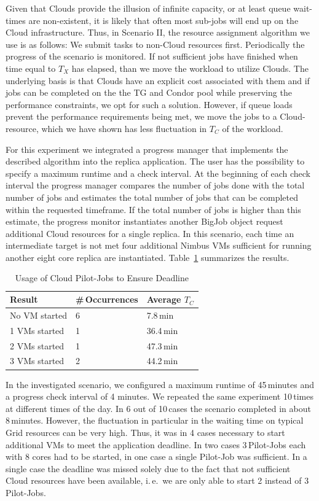 \documentclass[conference,final]{IEEEtran}
\newcommand{\tmax}{$T_{max}$ }
\newcommand{\tc}{$T_{C}$ }
\begin{document}
Given that Clouds provide the illusion of infinite capacity, or at
least queue wait-times are non-existent, it is likely that often most
sub-jobs will end up on the Cloud infrastructure.  Thus, in Scenario
II, the resource assignment algorithm we use is as follows: We submit
tasks to non-Cloud resources first. Periodically the progress of the
scenario is monitored. If not sufficient jobs have finished
when time equal to $T_{X}$ has elapsed,
than we move the workload to utilize Clouds.  The
underlying basis is that Clouds have an explicit cost associated with
them and if jobs can be completed on the the TG and Condor pool while
preserving the performance constraints, we opt for such a
solution. However, if queue loads prevent the performance requirements
being met, we move the jobs to a Cloud-resource, which we have shown
has less fluctuation in \tc of the workload.

For this experiment we integrated a progress manager that implements
the described algorithm into the replica application.  The user has
the possibility to specify a maximum runtime and a check interval.  At
the beginning of each check interval the progress manager compares the
number of jobs done with the total number of jobs and estimates the
total number of jobs that can be completed within the requested
timeframe. If the total number of jobs is higher than this estimate,
the progress monitor instantiates another BigJob object request
additional Cloud resources for a single replica.  In this scenario,
each time an intermediate target is not met four additional Nimbus VMs
sufficient for running another eight core replica are instantiated.
Table~\ref{tab:app_deadline} summarizes the results.

\begin{table}[ht]
    \centering
	\begin{tabular}{|l|l|l|}
	\hline
    Result & \#\,Occurrences &Average \tc \\ \hline
	No VM started &6 &7.8\,min\\ \hline
	1 VMs started &1 &36.4\,min\\ \hline
	2 VMs started &1 &47.3\,min\\ \hline
	3 VMs started &2 &44.2\,min\\ \hline
	\end{tabular}
	\caption{Usage of Cloud Pilot-Jobs to Ensure Deadline \label{tab:app_deadline}}
\end{table}

In the investigated scenario, we configured a maximum runtime of
45\,minutes and a progress check interval of 4 minutes. We repeated
the same experiment 10\,times at different times of the day. In 6 out
of 10\,cases the scenario completed in about 8\,minutes. However, the
fluctuation in particular in the waiting time on typical Grid
resources can be very high. Thus, it was in 4 cases necessary to
start additional VMs to meet the application deadline. 
In two cases 3\,Pilot-Jobs each with 8 cores had to be
started, in one case a single Pilot-Job was sufficient. 
In a single case the deadline was missed
solely due to the fact that not sufficient Cloud resources have been
available, i.\,e.\ we are only able to start 2 instead of 3 Pilot-Jobs. 
\end{document}
